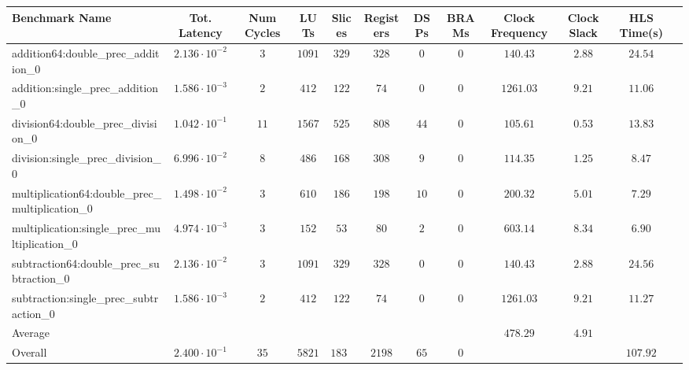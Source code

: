 \begin{tabular}{|l|c|c|c|c|c|c|c|c|c|c|c|}
\hline
Benchmark Name                                   & Tot. Latency            & Num Cycles & LUTs     & Slices   & Registers & DSPs   & BRAMs & Clock Frequency & Clock Slack & HLS Time(s) \\
\hline
addition64:double\_prec\_addition\_0             & $ 2.136 \cdot 10^{-2} $ & $ 3      $ & $ 1091 $ & $ 329  $ & $ 328   $ & $ 0  $ & $ 0 $ & $ 140.43      $ & $ 2.88    $ & $ 24.54   $ \\
addition:single\_prec\_addition\_0               & $ 1.586 \cdot 10^{-3} $ & $ 2      $ & $ 412  $ & $ 122  $ & $ 74    $ & $ 0  $ & $ 0 $ & $ 1261.03     $ & $ 9.21    $ & $ 11.06   $ \\
division64:double\_prec\_division\_0             & $ 1.042 \cdot 10^{-1} $ & $ 11     $ & $ 1567 $ & $ 525  $ & $ 808   $ & $ 44 $ & $ 0 $ & $ 105.61      $ & $ 0.53    $ & $ 13.83   $ \\
division:single\_prec\_division\_0               & $ 6.996 \cdot 10^{-2} $ & $ 8      $ & $ 486  $ & $ 168  $ & $ 308   $ & $ 9  $ & $ 0 $ & $ 114.35      $ & $ 1.25    $ & $ 8.47    $ \\
multiplication64:double\_prec\_multiplication\_0 & $ 1.498 \cdot 10^{-2} $ & $ 3      $ & $ 610  $ & $ 186  $ & $ 198   $ & $ 10 $ & $ 0 $ & $ 200.32      $ & $ 5.01    $ & $ 7.29    $ \\
multiplication:single\_prec\_multiplication\_0   & $ 4.974 \cdot 10^{-3} $ & $ 3      $ & $ 152  $ & $ 53   $ & $ 80    $ & $ 2  $ & $ 0 $ & $ 603.14      $ & $ 8.34    $ & $ 6.90    $ \\
subtraction64:double\_prec\_subtraction\_0       & $ 2.136 \cdot 10^{-2} $ & $ 3      $ & $ 1091 $ & $ 329  $ & $ 328   $ & $ 0  $ & $ 0 $ & $ 140.43      $ & $ 2.88    $ & $ 24.56   $ \\
subtraction:single\_prec\_subtraction\_0         & $ 1.586 \cdot 10^{-3} $ & $ 2      $ & $ 412  $ & $ 122  $ & $ 74    $ & $ 0  $ & $ 0 $ & $ 1261.03     $ & $ 9.21    $ & $ 11.27   $ \\
\hline
Average                                          & $                     $ & $        $ & $      $ & $      $ & $       $ & $    $ & $   $ & $ 478.29      $ & $ 4.91    $ & $         $ \\
\hline
Overall                                          & $ 2.400 \cdot 10^{-1} $ & $ 35     $ & $ 5821 $ & $ 1834 $ & $ 2198  $ & $ 65 $ & $ 0 $ & $             $ & $         $ & $ 107.92  $ \\
\hline
\end{tabular}
